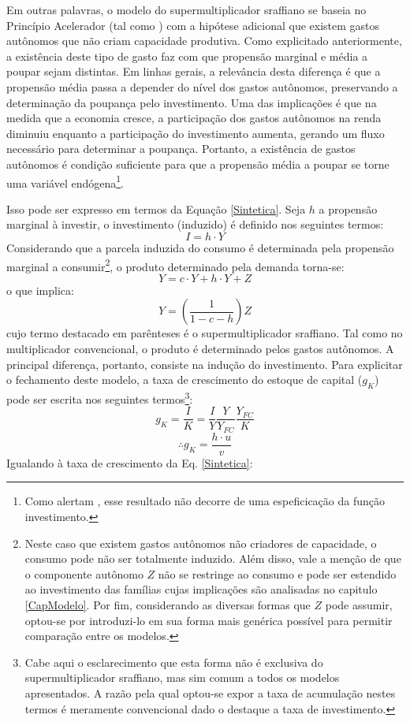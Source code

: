 Em outras palavras, o modelo do supermultiplicador sraffiano se baseia no Princípio Acelerador (tal como \textcite{harrod_essay_1939}) com a hipótese adicional que existem gastos autônomos que não criam capacidade produtiva. Como explicitado anteriormente, a existência deste tipo de gasto faz com que propensão marginal e média a poupar sejam distintas. Em linhas gerais, a relevância desta diferença é que a propensão média passa a depender do nível dos gastos autônomos, preservando a determinação da poupança pelo investimento.  Uma das implicações é que na medida que a economia cresce, a participação dos gastos autônomos na renda diminuiu enquanto a participação do investimento aumenta, gerando um fluxo necessário para determinar a poupança. Portanto, a existência de gastos autônomos é condição suficiente para que a propensão média a poupar se torne uma variável endógena\footnote{Como alertam \textcite{serrano_sraffian_2017}, esse resultado não decorre de uma espeficicação da função investimento.}.

Isso pode ser expresso em termos da Equação \ref{Sintetica}. Seja $h$ a propensão marginal à investir, o investimento (induzido) é definido nos seguintes termos:
$$
I = h\cdot Y
$$
Considerando que a parcela induzida do consumo é determinada pela propensão marginal a consumir\footnote{Neste caso que existem gastos autônomos não criadores de capacidade, o consumo pode não ser totalmente induzido. Além disso, vale a menção de que o componente autônomo $Z$ não se restringe ao consumo e pode ser estendido ao investimento das famílias cujas implicações são analisadas no capitulo \ref{CapModelo}. Por fim, considerando as diversas formas que $Z$ pode assumir, optou-se por introduzi-lo em sua forma mais genérica possível para permitir comparação entre os modelos.}, o produto determinado pela demanda torna-se:
\begin{equation}
\label{PIBSuper}
    Y = c\cdot Y + h\cdot Y + Z
\end{equation}
o que implica:
\begin{equation}
\label{Supermultiplicador}
Y = \left(\frac{1}{1 - c - h}\right)Z
\end{equation}
cujo termo destacado em parênteses é o supermultiplicador sraffiano. Tal como no multiplicador convencional, o produto é determinado pelos gastos autônomos. A principal diferença, portanto, consiste na indução do investimento. Para explicitar o fechamento deste modelo, a taxa de crescimento do estoque de capital ($g_K$) pode ser escrita nos seguintes termos\footnote{Cabe aqui o esclarecimento que esta forma não é exclusiva do supermultiplicador sraffiano, mas sim comum a todos os modelos apresentados. A razão pela qual optou-se expor a taxa de acumulação nestes termos é meramente convencional dado o destaque a taxa de investimento.}:
$$
g_K = \frac{I}{K} = \frac{I}{Y}\frac{Y}{Y_{FC}}\frac{Y_{FC}}{K}
$$
$$
\therefore g_K = \frac{h\cdot u}{v}
$$
Igualando à taxa de crescimento da Eq. \ref{Sintetica}:

